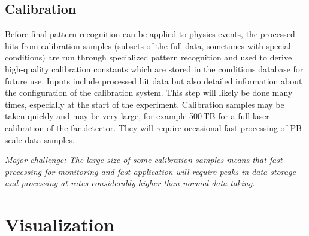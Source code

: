 \documentclass[../main-v1.tex]{subfiles}
\begin{document}
\subsection{Calibration }

Before final pattern recognition can be applied to physics events,  the processed hits from calibration samples (subsets of the full data, sometimes with special conditions) are run through specialized pattern recognition and used to derive high-quality calibration constants which are stored in the conditions database for future use.  Inputs include processed hit data but also detailed information about the configuration of the calibration system.  This step will likely be done many times, especially at the start of the experiment. Calibration samples may be taken quickly and may be very large, for example 500\,TB for a full laser calibration of the far detector. They will require occasional fast processing of PB-scale data samples. 

{\it Major challenge: The large size of some calibration samples means that fast processing for monitoring and fast application will require peaks in data storage and processing at rates considerably higher than normal data taking.}

%
%

\section{Visualization}
\label{sec:visualization}
\end{document}
